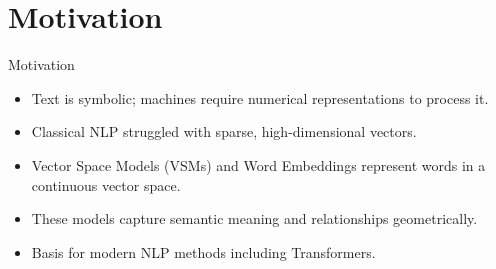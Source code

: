 \section{Motivation}
\begin{frame}{Motivation}
    \begin{itemize}
        \setlength{\itemsep}{1em}
        \item Text is symbolic; machines require numerical representations to process it.
        \item Classical NLP struggled with sparse, high-dimensional vectors.
        \item Vector Space Models (VSMs) and Word Embeddings represent words in a continuous vector space.
        \item These models capture semantic meaning and relationships geometrically.
        \item Basis for modern NLP methods including Transformers.
    \end{itemize}
\end{frame}